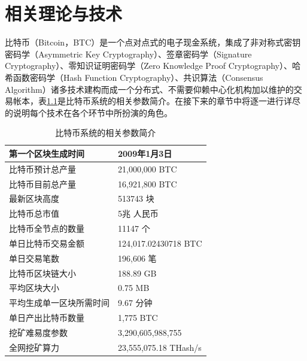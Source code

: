  
\chapter{相关理论与技术}
	
		⽐特币（Bitcoin，BTC）是⼀个点对点式的电⼦现⾦系统，集成了非对称式密钥密码学（Asymmetric Key Cryptography）\supercite{AsymmetricKeyCryptography}、签章密码学（Signature Cryptography）\supercite{Apublickeycryptosystemandasignatureschemebasedondiscretelogarithms}、零知识证明密码学（Zero Knowledge Proof Cryptography）\supercite{Zero-KnowledgeProofsofIdentity}、哈希函数密码学（Hash Function Cryptography）、共识算法（Consensus Algorithm）\supercite{Anonymousbyzantineconsensusfrommoderately-hardpuzzles:Amodelforbitcoin}诸多技术建构而成一个分布式、不需要仰赖中心化机构加以维护的交易帐本，表\ref{IntroductiontoBitcoin}是比特币系统的相关参数简介。在接下来的章节中将逐一进行详尽的说明每个技术在各个环节中所扮演的角色。

		\begin{table}[!htb]
		\centering
		\caption{比特币系统的相关参数简介}
		\label{IntroductiontoBitcoin}
		\begin{tabular}{|l|l|}
		\hline
		第一个区块生成时间 & 2009年1月3日 \\ \hline
		比特币预计总产量 & 21,000,000 BTC \\ \hline
		比特币目前总产量 & 16,921,800 BTC \\ \hline
		最新区块高度 & 513743 块 \\ \hline
		比特币总市值 & 5兆 人民币 \\ \hline
		比特币全节点的数量 & 11147 个 \\ \hline
		单日比特币交易金额 & 124,017.02430718 BTC \\ \hline
		单日交易笔数 & 196,606 笔 \\ \hline
		比特币区块链大小 & 188.89 GB \\ \hline
		平均区块大小 & 0.75 MB \\ \hline
		平均生成单一区块所需时间 & 9.67 分钟 \\ \hline
		单日产出比特币数量 & 1,775 BTC \\ \hline
		挖矿难易度参数 & 3,290,605,988,755 \\ \hline
		全网挖矿算力 & 23,555,075.18 THash/s \\ \hline
		\end{tabular}
		\end{table}
		
